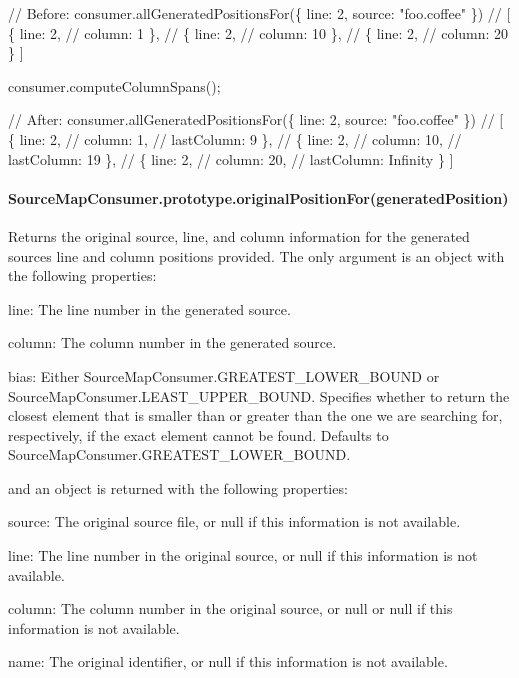 \begin{DoxyCode}
// Before:
consumer.allGeneratedPositionsFor(\{ line: 2, source: "foo.coffee" \})
// [ \{ line: 2,
//     column: 1 \},
//   \{ line: 2,
//     column: 10 \},
//   \{ line: 2,
//     column: 20 \} ]

consumer.computeColumnSpans();

// After:
consumer.allGeneratedPositionsFor(\{ line: 2, source: "foo.coffee" \})
// [ \{ line: 2,
//     column: 1,
//     lastColumn: 9 \},
//   \{ line: 2,
//     column: 10,
//     lastColumn: 19 \},
//   \{ line: 2,
//     column: 20,
//     lastColumn: Infinity \} ]
\end{DoxyCode}


\paragraph*{Source\+Map\+Consumer.\+prototype.\+original\+Position\+For(generated\+Position)}

Returns the original source, line, and column information for the generated source\textquotesingle{}s line and column positions provided. The only argument is an object with the following properties\+:


\begin{DoxyItemize}
\item {\ttfamily line}\+: The line number in the generated source.
\item {\ttfamily column}\+: The column number in the generated source.
\item {\ttfamily bias}\+: Either {\ttfamily Source\+Map\+Consumer.\+G\+R\+E\+A\+T\+E\+S\+T\+\_\+\+L\+O\+W\+E\+R\+\_\+\+B\+O\+U\+ND} or {\ttfamily Source\+Map\+Consumer.\+L\+E\+A\+S\+T\+\_\+\+U\+P\+P\+E\+R\+\_\+\+B\+O\+U\+ND}. Specifies whether to return the closest element that is smaller than or greater than the one we are searching for, respectively, if the exact element cannot be found. Defaults to {\ttfamily Source\+Map\+Consumer.\+G\+R\+E\+A\+T\+E\+S\+T\+\_\+\+L\+O\+W\+E\+R\+\_\+\+B\+O\+U\+ND}.
\end{DoxyItemize}

and an object is returned with the following properties\+:


\begin{DoxyItemize}
\item {\ttfamily source}\+: The original source file, or null if this information is not available.
\item {\ttfamily line}\+: The line number in the original source, or null if this information is not available.
\item {\ttfamily column}\+: The column number in the original source, or null or null if this information is not available.
\item {\ttfamily name}\+: The original identifier, or null if this information is not available.
\end{DoxyItemize}


